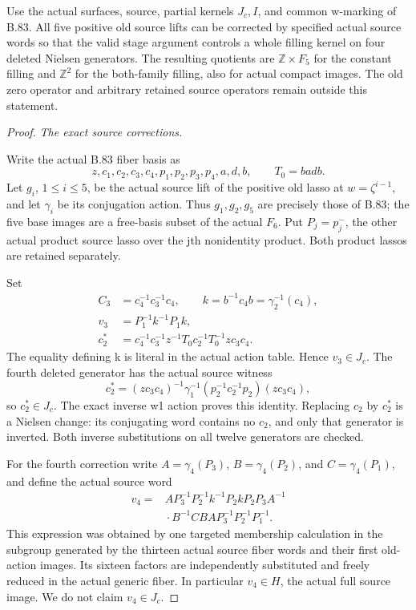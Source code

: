 Use the actual surfaces, source, partial kernels \(J_c,I\), and common
w-marking of B.83. All five positive old source lifts can be corrected
by specified actual source words so that the valid stage argument
controls a whole filling kernel on four deleted Nielsen generators.
The resulting quotients are \(\mathbb Z\times F_5\) for the constant
filling and \(\mathbb Z^2\) for the both-family filling, also for actual
compact images. The old zero operator and arbitrary retained source
operators remain outside this statement.

\begin{proof}
\emph{The exact source corrections.}\par
Write the actual B.83 fiber basis as
\[
 z,c_1,c_2,c_3,c_4,p_1,p_2,p_3,p_4,a,d,b,
 \qquad T_0=badb.
 \tag{B.84.1}
\]
Let \(g_i\), \(1\leq i\leq5\), be the actual source lift of the
positive old lasso at \(w=\zeta^{i-1}\), and let \(\gamma_i\) be its
conjugation action. Thus \(g_1,g_2,g_5\) are precisely those of B.83;
the five base images are a free-basis subset of the actual \(F_6\).
Put \(P_j=p_j^-\), the other actual product source lasso over the
jth nonidentity product. Both product lassos are retained separately.

Set
\[
 \begin{split}
 C_3&=c_4^{-1}c_3^{-1}c_4,\qquad
 k=b^{-1}c_4b=\gamma_2^{-1}(c_4),\\
 v_3&=P_1^{-1}k^{-1}P_1k,\\
 c_2^*&=c_4^{-1}c_3^{-1}z^{-1}T_0c_2^{-1}T_0^{-1}zc_3c_4.
 \end{split}
 \tag{B.84.2}
\]
The equality defining k is literal in the actual action table. Hence
\(v_3\in J_c\). The fourth deleted generator has the actual source
witness
\[
 c_2^*=(zc_3c_4)^{-1}
       \gamma_1^{-1}(p_2^{-1}c_2^{-1}p_2)(zc_3c_4),
 \tag{B.84.3}
\]
so \(c_2^*\in J_c\). The exact inverse w1 action proves this identity.
Replacing \(c_2\) by \(c_2^*\) is a Nielsen change: its conjugating
word contains no \(c_2\), and only that generator is inverted.
Both inverse substitutions on all twelve generators are checked.

For the fourth correction write
\(A=\gamma_4(P_3)\), \(B=\gamma_4(P_2)\), and
\(C=\gamma_4(P_1)\), and define the actual source word
\[
 \begin{split}
 v_4={}&A P_3^{-1}P_2^{-1}k^{-1}P_2kP_2P_3A^{-1}\\
       &\mathord{}\cdot B^{-1}CBAP_3^{-1}P_2^{-1}P_1^{-1}.
 \end{split}
 \tag{B.84.4}
\]
This expression was obtained by one targeted membership calculation in
the subgroup generated by the thirteen actual source fiber words and
their first old-action images. Its sixteen factors are independently
substituted and freely reduced in the actual generic fiber.
In particular \(v_4\in H\), the actual full source image. We do not
claim \(v_4\in J_c\).


\end{proof}
